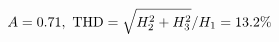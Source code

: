 \documentclass[preview]{standalone}
\begin{document}
\begin{align*}
\special{dvisvgm:raw <g id='unique000'>}A=0.71,\ \text{THD}=\sqrt{H_2^2+H_3^2}/H_1=13.2\%\special{dvisvgm:raw </g>}
\end{align*}
\end{document}
